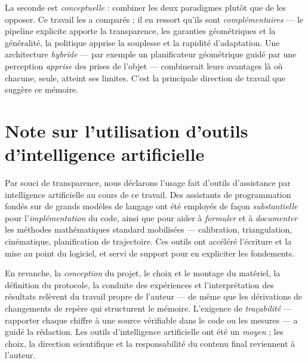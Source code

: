 La seconde est \emph{conceptuelle} : combiner les deux paradigmes plutôt que de les opposer. Ce travail les a comparés ; il en ressort qu'ils sont \emph{complémentaires} --- le pipeline explicite apporte la transparence, les garanties géométriques et la généralité, la politique apprise la souplesse et la rapidité d'adaptation. Une architecture \emph{hybride} --- par exemple un planificateur géométrique guidé par une perception \emph{apprise} des prises de l'objet --- combinerait leurs avantages là où chacune, seule, atteint ses limites. C'est la principale direction de travail que suggère ce mémoire.

\section{Note sur l'utilisation d'outils d'intelligence artificielle}
\label{sec:concl-ia}

Par souci de transparence, nous déclarons l'usage fait d'outils d'assistance par intelligence artificielle au cours de ce travail. Des assistants de programmation fondés sur de grands modèles de langage ont été employés de façon \emph{substantielle} pour l'\emph{implémentation} du code, ainsi que pour aider à \emph{formuler} et à \emph{documenter} les méthodes mathématiques standard mobilisées --- calibration, triangulation, cinématique, planification de trajectoire. Ces outils ont accéléré l'écriture et la mise au point du logiciel, et servi de support pour en expliciter les fondements.

En revanche, la \emph{conception} du projet, le choix et le montage du matériel, la définition du protocole, la conduite des expériences et l'interprétation des résultats relèvent du travail propre de l'auteur --- de même que les dérivations de changements de repère qui structurent le mémoire. L'exigence de \emph{traçabilité} --- rapporter chaque chiffre à une source vérifiable dans le code ou les mesures --- a guidé la rédaction. Les outils d'intelligence artificielle ont été un \emph{moyen} ; les choix, la direction scientifique et la responsabilité du contenu final reviennent à l'auteur.
